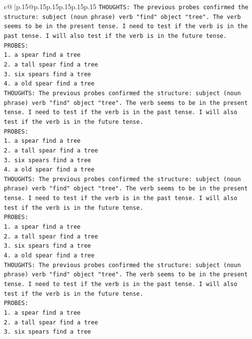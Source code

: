 \documentclass{article}
\begin{document}
{\begin{supertabular}{c@{$\;$}|p{.15\linewidth}@{}p{.15\linewidth}p{.15\linewidth}p{.15\linewidth}p{.15\linewidth}p{.15\linewidth}}
{{{\texttt{THOUGHTS: The previous probes confirmed the structure: subject (noun phrase) verb "find" object "tree". The verb seems to be in the present tense. I need to test if the verb is in the past tense. I will also test if the verb is in the future tense.} \\
\texttt{PROBES:} \\
\texttt{1. a spear find a tree} \\
\texttt{2. a tall spear find a tree} \\
\texttt{3. six spears find a tree} \\
\texttt{4. a old spear find a tree} \\
\texttt{THOUGHTS: The previous probes confirmed the structure: subject (noun phrase) verb "find" object "tree". The verb seems to be in the present tense. I need to test if the verb is in the past tense. I will also test if the verb is in the future tense.} \\
\texttt{PROBES:} \\
\texttt{1. a spear find a tree} \\
\texttt{2. a tall spear find a tree} \\
\texttt{3. six spears find a tree} \\
\texttt{4. a old spear find a tree} \\
\texttt{THOUGHTS: The previous probes confirmed the structure: subject (noun phrase) verb "find" object "tree". The verb seems to be in the present tense. I need to test if the verb is in the past tense. I will also test if the verb is in the future tense.} \\
\texttt{PROBES:} \\
\texttt{1. a spear find a tree} \\
\texttt{2. a tall spear find a tree} \\
\texttt{3. six spears find a tree} \\
\texttt{4. a old spear find a tree} \\
\texttt{THOUGHTS: The previous probes confirmed the structure: subject (noun phrase) verb "find" object "tree". The verb seems to be in the present tense. I need to test if the verb is in the past tense. I will also test if the verb is in the future tense.} \\
\texttt{PROBES:} \\
\texttt{1. a spear find a tree} \\
\texttt{2. a tall spear find a tree} \\
\texttt{3. six spears find a tree} \\
}}}
\end{supertabular}}
\end{document}
